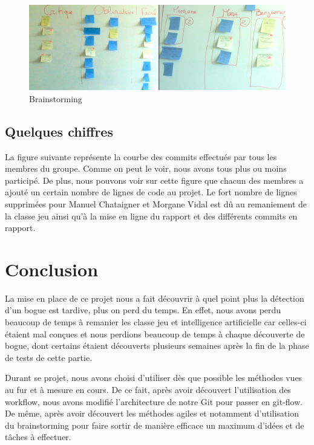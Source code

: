 \documentclass{report}
\begin{document}
\begin{figure}[H]
\begin{center}
\includegraphics[scale=0.1]{./brainstorming.jpg}
\caption{Brainstorming}
\end{center}
\end{figure}

\section{Quelques chiffres}
\hspace{0.5cm}La figure suivante représente la courbe des commits effectués par tous les membres du groupe. Comme on peut le voir, nous avons tous plus ou moins participé. De plus, nous pouvons voir sur cette figure que chacun des membres a ajouté un certain nombre de lignes de code au projet. Le fort nombre de lignes supprimées pour Manuel Chataigner et Morgane Vidal est dû au remaniement de la classe jeu ainsi qu'à la mise en ligne du rapport et des différents commits en rapport.\par





\chapter{Conclusion}

\hspace{0.5cm}La mise en place de ce projet nous a fait découvrir à quel point plus la détection d'un bogue est tardive, plus on perd du temps. En effet, nous avons perdu beaucoup de temps à remanier les classe jeu et intelligence artificielle car celles-ci étaient mal conçues et nous perdions beaucoup de temps à chaque découverte de bogue, dont certains étaient découverts plusieurs semaines après la fin de la phase de tests de cette partie. \par
Durant se projet, nous avons choisi d'utiliser dès que possible les méthodes vues au fur et à mesure en cours. De ce fait, après avoir découvert l'utilisation des workflow, nous avons modifié l'architecture de notre Git pour passer en git-flow. De même, après avoir découvert les méthodes agiles et notamment d'utilisation du brainstorming pour faire sortir de manière efficace un maximum d'idées et de tâches à effectuer. \par
\end{document}
